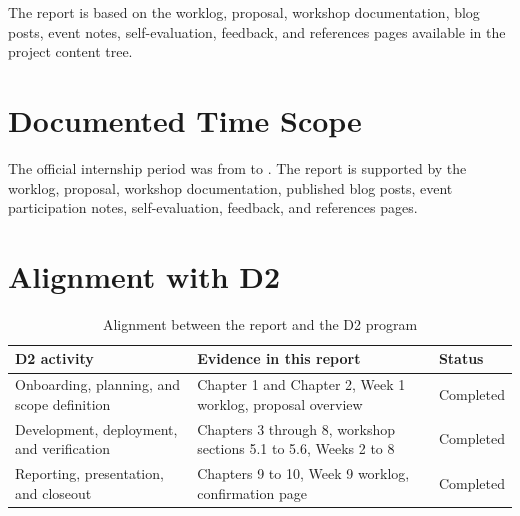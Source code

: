 The report is based on the worklog, proposal, workshop documentation, blog
posts, event notes, self-evaluation, feedback, and references pages available
in the project content tree.

\section{Documented Time Scope}

The official internship period was from \InternshipStartDate{} to
\InternshipEndDate. The report is supported by the worklog, proposal,
workshop documentation, published blog posts, event participation notes,
self-evaluation, feedback, and references pages.

\section{Alignment with D2}

\begin{table}[H]
  \centering
  \caption{Alignment between the report and the D2 program}
  \begin{tabularx}{\textwidth}{@{}P{4.2cm}YP{2.8cm}@{}}
    \toprule
    \textbf{D2 activity} & \textbf{Evidence in this report} & \textbf{Status} \\
    \midrule
    Onboarding, planning, and scope definition &
      Chapter 1 and Chapter 2, Week 1 worklog, proposal overview &
      Completed \\
    \addlinespace
    Development, deployment, and verification &
      Chapters 3 through 8, workshop sections 5.1 to 5.6, Weeks 2 to 8 &
      Completed \\
    \addlinespace
    Reporting, presentation, and closeout &
      Chapters 9 to 10, Week 9 worklog, confirmation page &
      Completed \\
    \bottomrule
  \end{tabularx}
\end{table}